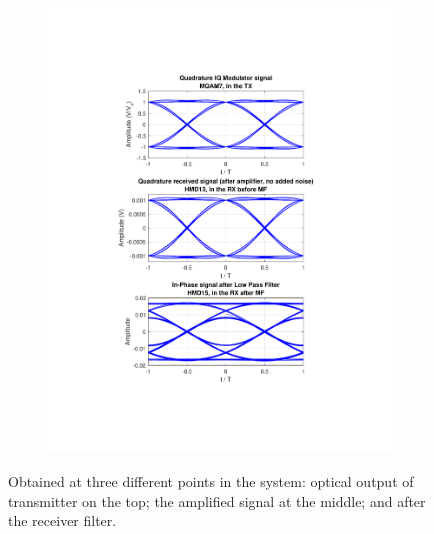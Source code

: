 \begin{refsection}
\begin{figure}[H]
\begin{minipage}{\linewidth}
\begin{subfigure}{.45\textwidth}
		\includegraphics[clip, trim=4cm 4cm 4cm 4cm,
			width=\textwidth]{./sdf/m_qam_system/figures/eyes/simulRc09Sp60Np00_q.pdf}
	\end{subfigure}
	
	\caption{
		Obtained at
		three different points in the system: optical output of transmitter on the top;
		the amplified signal at the middle; and
		after the receiver filter.
		\label{fig:eyes_nn_rc_09}}
	\end{minipage}
\end{figure}


\end{refsection}
